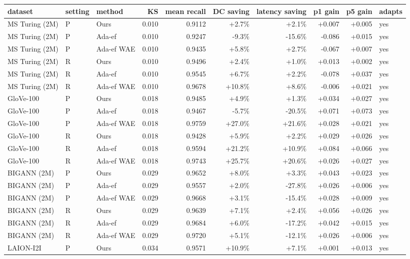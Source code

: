 \begin{tabular}{lllrrrrrrl}
\toprule
dataset & setting & method & KS & mean recall & DC saving & latency saving & p1 gain & p5 gain & adapts \\
\midrule
MS Turing (2M) & P & Ours & 0.010 & 0.9112 & +2.7\% & +2.1\% & +0.007 & +0.005 & yes \\
MS Turing (2M) & P & Ada-ef & 0.010 & 0.9247 & -9.3\% & -15.6\% & -0.086 & +0.015 & yes \\
MS Turing (2M) & P & Ada-ef WAE & 0.010 & 0.9435 & +5.8\% & +2.7\% & -0.067 & +0.007 & yes \\
MS Turing (2M) & R & Ours & 0.010 & 0.9496 & +2.4\% & +1.0\% & +0.013 & +0.002 & yes \\
MS Turing (2M) & R & Ada-ef & 0.010 & 0.9545 & +6.7\% & +2.2\% & -0.078 & +0.037 & yes \\
MS Turing (2M) & R & Ada-ef WAE & 0.010 & 0.9678 & +10.8\% & +8.6\% & -0.006 & +0.021 & yes \\
GloVe-100 & P & Ours & 0.018 & 0.9485 & +4.9\% & +1.3\% & +0.034 & +0.027 & yes \\
GloVe-100 & P & Ada-ef & 0.018 & 0.9467 & -5.7\% & -20.5\% & +0.071 & +0.073 & yes \\
GloVe-100 & P & Ada-ef WAE & 0.018 & 0.9759 & +27.0\% & +21.6\% & +0.028 & +0.021 & yes \\
GloVe-100 & R & Ours & 0.018 & 0.9428 & +5.9\% & +2.2\% & +0.029 & +0.026 & yes \\
GloVe-100 & R & Ada-ef & 0.018 & 0.9594 & +21.2\% & +10.9\% & +0.084 & +0.066 & yes \\
GloVe-100 & R & Ada-ef WAE & 0.018 & 0.9743 & +25.7\% & +20.6\% & +0.026 & +0.027 & yes \\
BIGANN (2M) & P & Ours & 0.029 & 0.9652 & +8.0\% & +3.3\% & +0.043 & +0.023 & yes \\
BIGANN (2M) & P & Ada-ef & 0.029 & 0.9557 & +2.0\% & -27.8\% & +0.026 & +0.006 & yes \\
BIGANN (2M) & P & Ada-ef WAE & 0.029 & 0.9668 & +3.1\% & -15.4\% & +0.028 & +0.009 & yes \\
BIGANN (2M) & R & Ours & 0.029 & 0.9639 & +7.1\% & +2.4\% & +0.056 & +0.026 & yes \\
BIGANN (2M) & R & Ada-ef & 0.029 & 0.9684 & +6.0\% & -17.2\% & +0.042 & +0.015 & yes \\
BIGANN (2M) & R & Ada-ef WAE & 0.029 & 0.9720 & +5.1\% & -12.1\% & +0.026 & +0.006 & yes \\
LAION-I2I & P & Ours & 0.034 & 0.9571 & +10.9\% & +7.1\% & +0.001 & +0.013 & yes \\

\end{tabular}

